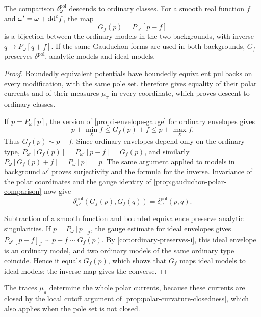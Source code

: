 \begin{corollary}\label{cor:polar-model-gauge-transport}
The comparison $\delta_\omega^{\mathrm{pol}}$ descends to ordinary classes. For a smooth real function $f$ and $\omega'=\omega+\mathrm{dd}^{\mathrm{c}} f$, the map
\[
 G_f(p)=P_{\omega'}[p-f]
\]
is a bijection between the ordinary models in the two backgrounds, with inverse $q\mapsto P_\omega[q+f]$. If the same Gauduchon forms are used in both backgrounds, $G_f$ preserves $\delta^{\mathrm{pol}}$, analytic models and ideal models.
\end{corollary}
\begin{proof}
Boundedly equivalent potentials have boundedly equivalent pullbacks on every modification, with the same pole set.  therefore gives equality of their polar currents and of their measures $\mu_\pi$ in every coordinate, which proves descent to ordinary classes.

If $p=P_\omega[p]$, the version of \cref{prop:i-envelope-gauge} for ordinary envelopes gives
\[
 p+\min_Xf\leq G_f(p)+f\leq p+\max_Xf.
\]
Thus $G_f(p)\sim p-f$. Since ordinary envelopes depend only on the ordinary type, $P_{\omega'}[G_f(p)]=P_{\omega'}[p-f]=G_f(p)$, and similarly $P_\omega[G_f(p)+f]=P_\omega[p]=p$. The same argument applied to models in background $\omega'$ proves surjectivity and the formula for the inverse. Invariance of the polar coordinates and the gauge identity of \cref{prop:gauduchon-polar-comparison} now give
\[
 \delta_{\omega'}^{\mathrm{pol}}(G_f(p),G_f(q))
       =\delta_\omega^{\mathrm{pol}}(p,q).
\]

Subtraction of a smooth function and bounded equivalence preserve analytic singularities. If $p=P_\omega[p]_{\mathcal I}$, the gauge estimate for ideal envelopes gives $P_{\omega'}[p-f]_{\mathcal I}\sim p-f\sim G_f(p)$. By \cref{cor:ordinary-preserves-i}, this ideal envelope is an ordinary model, and two ordinary models of the same ordinary type coincide. Hence it equals $G_f(p)$, which shows that $G_f$ maps ideal models to ideal models; the inverse map gives the converse.
\end{proof}

The traces $\mu_\pi$ determine the whole polar currents, because these currents are closed by the local cutoff argument of \cref{prop:polar-curvature-closedness}, which also applies when the pole set is not closed.

